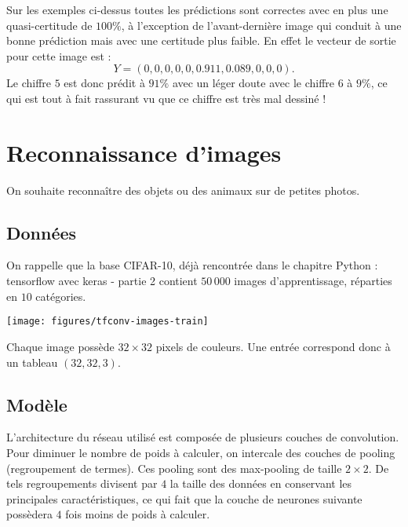 \documentclass[11pt,class=report,crop=false]{standalone}
\begin{document}
Sur les exemples ci-dessus toutes les prédictions sont correctes avec en plus une quasi-certitude de $100\%$, à l'exception de l'avant-dernière image qui conduit à une bonne prédiction mais avec une certitude plus faible.
En effet le vecteur de sortie pour cette image est :
$$Y = (0, 0, 0, 0, 0, 0.911, 0.089, 0, 0, 0).$$
Le chiffre $5$ est donc prédit à $91\%$ avec un léger doute avec le chiffre $6$ à $9\%$, ce qui est tout à fait rassurant vu que ce chiffre est très mal dessiné !



\section{Reconnaissance d'images}

On souhaite reconnaître des objets ou des animaux sur de petites photos.

\subsection{Données}

On rappelle que la base CIFAR-10, déjà rencontrée dans le chapitre \og{}Python : tensorflow avec keras - partie 2\fg{} contient $50\,000$ images d'apprentissage, réparties en $10$ catégories.

\begin{center}
\texttt{[image: figures/tfconv-images-train]}
\end{center}

Chaque image possède $32\times 32$ pixels de couleurs. Une entrée correspond donc à un tableau
$(32,32,3)$.


\subsection{Modèle}

L'architecture du réseau utilisé est composée de plusieurs couches de convolution.
Pour diminuer le nombre de poids à calculer, on intercale des couches de pooling (regroupement de termes). Ces pooling sont des max-pooling de taille $2 \times 2$.
De tels regroupements divisent par $4$ la taille des données en conservant les principales caractéristiques, ce qui fait que la couche de neurones suivante possèdera $4$ fois moins de poids à calculer.
 
\end{document}
